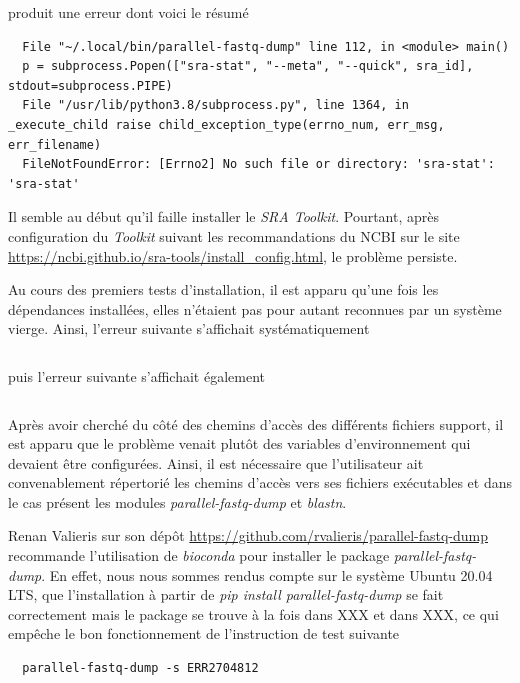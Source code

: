 \documentclass[twoside,a4paper,11pt,frenchb,openany]{report}
\begin{document}
produit une erreur dont voici le résumé

\begin{verbatim}
  File "~/.local/bin/parallel-fastq-dump" line 112, in <module> main()
  p = subprocess.Popen(["sra-stat", "--meta", "--quick", sra_id], stdout=subprocess.PIPE)
  File "/usr/lib/python3.8/subprocess.py", line 1364, in _execute_child raise child_exception_type(errno_num, err_msg, err_filename)
  FileNotFoundError: [Errno2] No such file or directory: 'sra-stat': 'sra-stat'
\end{verbatim}

Il semble au début qu'il faille installer le \textit{SRA Toolkit}. Pourtant, après configuration du \textit{Toolkit} suivant les recommandations du NCBI sur le site \url{https://ncbi.github.io/sra-tools/install_config.html}, le problème persiste.

Au cours des premiers tests d'installation, il est apparu qu'une fois les dépendances installées, elles n'étaient pas pour autant reconnues par un système vierge. Ainsi, l'erreur suivante s'affichait systématiquement

\begin{verbatim}

\end{verbatim}

puis l'erreur suivante s'affichait également

\begin{verbatim}

\end{verbatim}

Après avoir cherché du côté des chemins d'accès des différents fichiers support, il est apparu que le problème venait plutôt des variables d'environnement qui devaient être configurées. Ainsi, il est nécessaire que l'utilisateur ait convenablement répertorié les chemins d'accès vers ses fichiers exécutables et dans le cas présent les modules \textit{parallel-fastq-dump} et \textit{blastn}.

Renan Valieris sur son dépôt \url{https://github.com/rvalieris/parallel-fastq-dump} recommande l'utilisation de \textit{bioconda} pour installer le package \textit{parallel-fastq-dump}. En effet, nous nous sommes rendus compte sur le système Ubuntu 20.04 LTS, que l'installation à partir de \textit{  pip install parallel-fastq-dump} se fait correctement mais le package se trouve à la fois dans XXX et dans XXX, ce qui empêche le bon fonctionnement de l'instruction de test suivante

\begin{verbatim}
  parallel-fastq-dump -s ERR2704812
\end{verbatim} 
\end{document}
